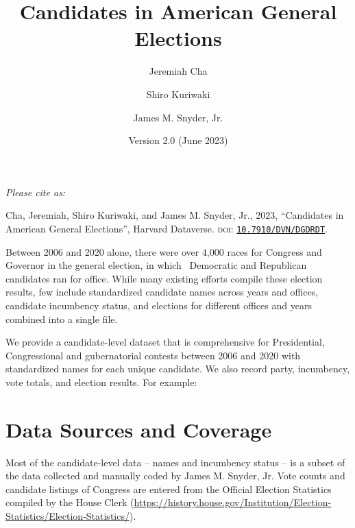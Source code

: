 \documentclass[12pt]{article}
\title{\Large\textbf{Candidates in American General Elections}}
\author[1]{\normalsize Jeremiah Cha}
\author[2]{\normalsize Shiro Kuriwaki}
\author[1]{\normalsize James M. Snyder, Jr.}
\affil[1]{\footnotesize Department of Government, Harvard University.}
\affil[2]{\footnotesize Department of Political Science and Institution of Social and Policy Studies, Yale University}
\date{\vspace{-0.2in} \normalsize Version 2.0 (June 2023)}
\begin{document}
\maketitle

\vspace{-0.2in}

\begin{center}
\begin{minipage}{0.75\linewidth}
\small

\emph{Please cite as: }

Cha, Jeremiah, Shiro Kuriwaki, and James M. Snyder, Jr., 2023, ``Candidates in American General Elections'', Harvard Dataverse. \textsc{doi}: \href{https://doi.org/10.7910/DVN/DGDRDT}{\texttt{10.7910/DVN/DGDRDT}}.
\end{minipage}
\end{center}
\smallskip

Between 2006 and 2020 alone, there were over 4,000 races for Congress and Governor in the general election, in which \unskip \ Democratic and Republican candidates ran for office.
While many existing efforts compile these election results, few include standardized candidate names across years and offices, candidate incumbency status, and elections for different offices and years combined into a single file.

We provide a candidate-level dataset that is comprehensive for Presidential, Congressional and gubernatorial contests between 2006 and 2020 with standardized names for each unique candidate. We also record party, incumbency, vote totals, and election results. For example:

\begin{table}[!h]
\centering
\footnotesize

\end{table}

\newpage

\section{Data Sources and Coverage}

Most of the candidate-level data -- names and incumbency status -- is a subset of the data collected and manually coded by James M. Snyder, Jr. Vote counts and candidate listings of Congress are entered from the Official Election Statistics compiled by the House Clerk (\url{https://history.house.gov/Institution/Election-Statistics/Election-Statistics/}).
\end{document}
